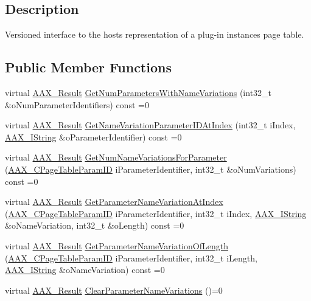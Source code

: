 \subsection{Description}
Versioned interface to the host\textquotesingle{}s representation of a plug-\/in instance\textquotesingle{}s page table. \subsection*{Public Member Functions}
\begin{DoxyCompactItemize}
\item 
virtual \hyperlink{a00149_a4d8f69a697df7f70c3a8e9b8ee130d2f}{A\+A\+X\+\_\+\+Result} \hyperlink{a00075_a325487a56b579e64a21dcfe1a2b435e9}{Get\+Num\+Parameters\+With\+Name\+Variations} (int32\+\_\+t \&o\+Num\+Parameter\+Identifiers) const =0
\item 
virtual \hyperlink{a00149_a4d8f69a697df7f70c3a8e9b8ee130d2f}{A\+A\+X\+\_\+\+Result} \hyperlink{a00075_ac342780ed3567c75d8a68458f0a4ff0c}{Get\+Name\+Variation\+Parameter\+I\+D\+At\+Index} (int32\+\_\+t i\+Index, \hyperlink{a00113}{A\+A\+X\+\_\+\+I\+String} \&o\+Parameter\+Identifier) const =0
\item 
virtual \hyperlink{a00149_a4d8f69a697df7f70c3a8e9b8ee130d2f}{A\+A\+X\+\_\+\+Result} \hyperlink{a00075_af0c22a440afacf5e9ebeaccab11ecde3}{Get\+Num\+Name\+Variations\+For\+Parameter} (\hyperlink{a00149_ab4e01b971dac1b25632fd9f710dd8f77}{A\+A\+X\+\_\+\+C\+Page\+Table\+Param\+I\+D} i\+Parameter\+Identifier, int32\+\_\+t \&o\+Num\+Variations) const =0
\item 
virtual \hyperlink{a00149_a4d8f69a697df7f70c3a8e9b8ee130d2f}{A\+A\+X\+\_\+\+Result} \hyperlink{a00075_ab866525f8d8902ed8782dc01087d71ce}{Get\+Parameter\+Name\+Variation\+At\+Index} (\hyperlink{a00149_ab4e01b971dac1b25632fd9f710dd8f77}{A\+A\+X\+\_\+\+C\+Page\+Table\+Param\+I\+D} i\+Parameter\+Identifier, int32\+\_\+t i\+Index, \hyperlink{a00113}{A\+A\+X\+\_\+\+I\+String} \&o\+Name\+Variation, int32\+\_\+t \&o\+Length) const =0
\item 
virtual \hyperlink{a00149_a4d8f69a697df7f70c3a8e9b8ee130d2f}{A\+A\+X\+\_\+\+Result} \hyperlink{a00075_ac4de2771c4025a98f83b89fc6104d9b0}{Get\+Parameter\+Name\+Variation\+Of\+Length} (\hyperlink{a00149_ab4e01b971dac1b25632fd9f710dd8f77}{A\+A\+X\+\_\+\+C\+Page\+Table\+Param\+I\+D} i\+Parameter\+Identifier, int32\+\_\+t i\+Length, \hyperlink{a00113}{A\+A\+X\+\_\+\+I\+String} \&o\+Name\+Variation) const =0
\item 
virtual \hyperlink{a00149_a4d8f69a697df7f70c3a8e9b8ee130d2f}{A\+A\+X\+\_\+\+Result} \hyperlink{a00075_ada210c1f77658103f2796ae3011bc603}{Clear\+Parameter\+Name\+Variations} ()=0

\end{DoxyCompactItemize}
